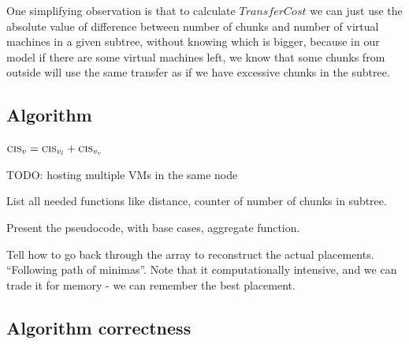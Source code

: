 One simplifying observation is that to calculate $TransferCost$ we can
just use the absolute value of difference between number of chunks and
number of virtual machines in a given subtree, without knowing which
is bigger, because in our model if there are some virtual machines
left, we know that some chunks from outside will use the same transfer
as if we have excessive chunks in the subtree.

\subsection{Algorithm}
\newcommand{\SumIndex}{\ensuremath{n}}
\begin{algorithm}[tbhp]
\DontPrintSemicolon %
\SetAlgoNoEnd
{}
$\textsc{cis}_{v} = \textsc{cis}_{v_l} +
\textsc{cis}_{v_r}$\;
\For{$\SumIndex \in \{0,\dots,\Vms\}$}{
  \For{$i \in \{0,\dots,\SumIndex\}$}{ \If{$\Opt_\SubstrateNode[\SumIndex]
  > \Opt_{\SubstrateNode_l}[i] +
\Opt_{\SubstrateNode_r}[\SumIndex - i]$}{
	$\Opt_\SubstrateNode[\SumIndex] \gets \Opt_{\SubstrateNode_l}[i]
	+
\Opt_{\SubstrateNode_r}[\SumIndex - i]$\;
    } }
  
 $bw \gets (\Vms -
\SumIndex) \cdot \SumIndex \cdot \CostCom +   |i - 
\ChunkCount_\SubstrateNode| \cdot \CostTrans$\; 
  \eIf{$bw \leq \Capacity(\Uplink(v))$}{
    $\Opt_\SubstrateNode[\SumIndex] \gets \Opt_\SubstrateNode[\SumIndex]
    + bw$\; }{ $\Opt_\SubstrateNode[\SumIndex] \gets \infty$\; } }
%
\caption{$aggregate(\SubstrateNode \in \SubstrateNodes)$}
\label{algo:dynAggregation}
\end{algorithm}

TODO: hosting multiple VMs in the same node

List all needed functions like distance, counter of number of chunks
in subtree.

Present the pseudocode, with base cases, aggregate function.

Tell how to go back through the array to reconstruct the actual
placements. ``Following path of minimas''.  Note that it
computationally intensive, and we can trade it for memory - we can
remember the best placement.

\subsection{Algorithm correctness}

